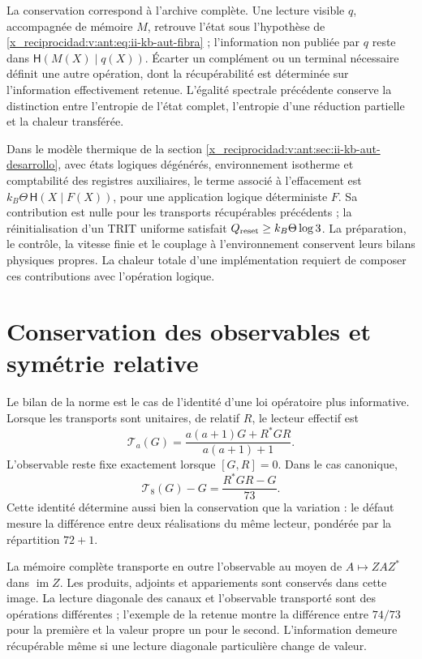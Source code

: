 La conservation correspond à l’archive complète. Une lecture visible
\(q\), accompagnée de mémoire \(M\), retrouve l’état sous
l’hypothèse de \eqref{x_reciprocidad:v:ant:eq:ii-kb-aut-fibra} ; l’information non
publiée par \(q\) reste dans
\(\mathsf H(M(X)\mid q(X))\). Écarter un complément ou un
terminal nécessaire définit une autre opération, dont la récupérabilité est
déterminée sur l’information effectivement retenue. L’égalité
spectrale précédente conserve la distinction entre l’entropie de l’état
complet, l’entropie d’une réduction partielle et la chaleur transférée.

Dans le modèle thermique de la section
\ref{x_reciprocidad:v:ant:sec:ii-kb-aut-desarrollo}, avec états logiques dégénérés,
environnement isotherme et comptabilité des registres auxiliaires, le terme
associé à l’effacement est
\(k_B\Theta\,\mathsf H(X\mid F(X))\), pour une application logique
déterministe \(F\). Sa contribution est nulle pour les transports
récupérables précédents ; la réinitialisation d’un TRIT uniforme satisfait
\(Q_{\rm reset}\geq k_B\Theta\log3\). La préparation, le contrôle,
la vitesse finie et le couplage à l’environnement conservent leurs
bilans physiques propres. La chaleur totale d’une implémentation
requiert de composer ces contributions avec l’opération logique.

\section{Conservation des observables et symétrie relative}
\label{x_reciprocidad:lib06:simetria}

Le bilan de la norme est le cas de l’identité d’une loi opératoire
plus informative. Lorsque les transports sont unitaires, de relatif
\(R\), le lecteur effectif est
\begin{equation}
 \mathcal T_a(G)=\frac{a(a+1)G+R^*GR}{a(a+1)+1}.
 \label{x_reciprocidad:lib06:lector}
\end{equation}
L'observable reste fixe exactement lorsque \([G,R]=0\). Dans le cas canonique,
\begin{equation}
 \mathcal T_8(G)-G=\frac{R^*GR-G}{73}.
 \label{x_reciprocidad:lib06:defecto-lector}
\end{equation}
Cette identité détermine aussi bien la conservation que la variation : le défaut mesure la différence entre deux réalisations du même lecteur, pondérée par la répartition \(72+1\).

La mémoire complète transporte en outre l’observable au moyen de
\(A\mapsto ZAZ^*\) dans \(\operatorname{im}Z\). Les produits,
adjoints et appariements sont conservés dans cette image. La lecture
diagonale des canaux et l’observable transporté sont des opérations
différentes ; l’exemple de la retenue montre la différence entre
\(74/73\) pour la première et la valeur propre un pour le second.
L’information demeure récupérable même si une lecture diagonale
particulière change de valeur.

